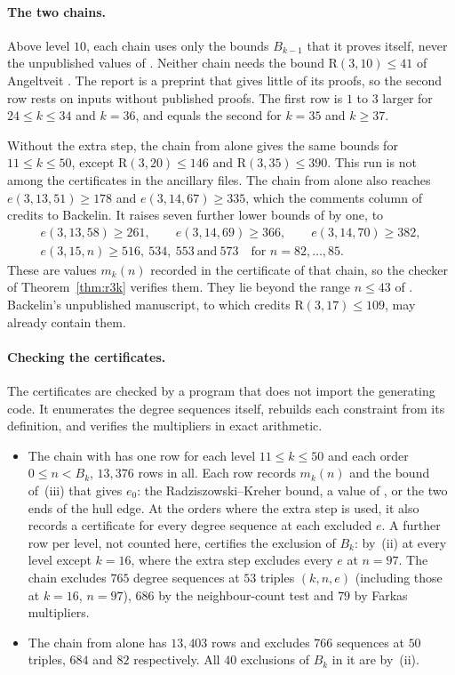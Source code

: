 \documentclass[11pt]{article}
\theoremstyle{spacedplain}
\theoremstyle{spaceddef}
\theoremstyle{spacedremark}
\newcommand{\R}{\mathrm{R}}
\begin{document}
\paragraph{The two chains.}
Above level $10$, each chain uses only the bounds $B_{k-1}$ that it proves itself, never the unpublished values of \cite{Rad26}.
Neither chain needs the bound $\R(3,10)\le 41$ of Angeltveit \cite{Ang25}.
The report \cite{Back3} is a preprint that gives little of its proofs, so the second row rests on inputs without published proofs.
The first row is $1$ to $3$ larger for $24\le k\le 34$ and $k=36$, and equals the second for $k=35$ and $k\ge 37$.

Without the extra step, the chain from \cite{GR13} alone gives the same bounds for $11\le k\le 50$, except $\R(3,20)\le 146$ and $\R(3,35)\le 390$.
This run is not among the certificates in the ancillary files.
The chain from \cite{GR13} alone also reaches $e(3,13,51)\ge 178$ and $e(3,14,67)\ge 335$, which the comments column of \cite[Tables~9 and~10]{GR13} credits to Backelin.
It raises seven further lower bounds of \cite[Tables~9--11]{GR13} by one, to
\begin{gather*}
e(3,13,58)\ge 261,\qquad e(3,14,69)\ge 366,\qquad e(3,14,70)\ge 382,\\
e(3,15,n)\ge 516,\ 534,\ 553\ \text{and}\ 573\quad\text{for } n=82,\dots,85.
\end{gather*}
These are values $m_k(n)$ recorded in the certificate of that chain, so the checker of Theorem~\ref{thm:r3k} verifies them.
They lie beyond the range $n\le 43$ of \cite{Back3}.
Backelin's unpublished manuscript, to which \cite{Rad26} credits $\R(3,17)\le 109$, may already contain them.

\paragraph{Checking the certificates.}
The certificates are checked by a program that does not import the generating code.
It enumerates the degree sequences itself, rebuilds each constraint from its definition, and verifies the multipliers in exact arithmetic.
\begin{itemize}
\item The chain with \cite{Back3} has one row for each level $11\le k\le 50$ and each order $0\le n<B_k$, $13{,}376$ rows in all.
Each row records $m_k(n)$ and the bound of~(iii) that gives $e_0$: the Radziszowski--Kreher bound, a value of \cite{Back3}, or the two ends of the hull edge.
At the orders where the extra step is used, it also records a certificate for every degree sequence at each excluded $e$.
A further row per level, not counted here, certifies the exclusion of $B_k$: by~(ii) at every level except $k=16$, where the extra step excludes every $e$ at $n=97$.
The chain excludes $765$ degree sequences at $53$ triples $(k,n,e)$ (including those at $k=16$, $n=97$), $686$ by the neighbour-count test and $79$ by Farkas multipliers.
\item The chain from \cite{GR13} alone has $13{,}403$ rows and excludes $766$ sequences at $50$ triples, $684$ and $82$ respectively.
All $40$ exclusions of $B_k$ in it are by~(ii).
\end{itemize}
\end{document}
